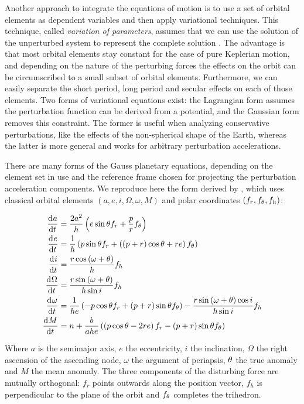 Another approach to integrate the equations of motion is to use a set of orbital elements as dependent variables and then apply variational techniques. This technique, called \textit{variation of parameters}, assumes that we can use the solution of the unperturbed system to represent the complete solution \cite{vallado2001fundamentals}. The advantage is that most orbital elements stay constant for the case of pure Keplerian motion, and depending on the nature of the perturbing forces the effects on the orbit can be circumscribed to a small subset of orbital elements. Furthermore, we can easily separate the short period, long period and secular effects on each of those elements. Two forms of variational equations exist: the Lagrangian form assumes the perturbation function can be derived from a potential, and the Gaussian form removes this constraint. The former is useful when analyzing conservative perturbations, like the effects of the non-spherical shape of the Earth, whereas the latter is more general and works for arbitrary perturbation accelerations.

There are many forms of the Gauss planetary equations, depending on the element set in use and the reference frame chosen for projecting the perturbation acceleration components. We reproduce here the form derived by \cite{battin1999introduction}, which uses classical orbital elements $(a, e, i, \Omega, \omega, M)$ and polar coordinates $(f_r, f_{\theta}, f_h)$:

\begin{align}
\deriv{a}{t} & = \frac{2 a^2}{h} \left( e \sin{\ta} f_r + \frac{p}{r} f_{\ta} \right) \\
\deriv{e}{t} & = \frac{1}{h} \left( p \sin{\ta} f_r + \left( \left( p + r \right) \cos{\ta} + r e \right) f_{\theta} \right) \\
\deriv{i}{t} & = \frac{r \cos{\arglat}}{h} f_h \\
\deriv{\Omega}{t} & = \frac{r \sin{\arglat}}{h \sin{i}} f_h \\
\deriv{\omega}{t} & = \frac{1}{he} \left( -p \cos{\ta} f_r + \left( p + r \right) \sin{\ta} f_{\theta} \right) - \frac{r \sin{\arglat} \cos{i}}{h \sin{i}} f_h \\
\deriv{M}{t} & = n + \frac{b}{ahe} \left( \left( p \cos{\ta} - 2 re \right) f_r - \left( p + r \right) \sin{\ta} f_{\ta} \right) \\
\end{align}

Where $a$ is the semimajor axis, $e$ the eccentricity, $i$ the inclination, $\Omega$ the right ascension of the ascending node, $\omega$ the argument of periapsis, $\theta$ the true anomaly and $M$ the mean anomaly. The three components of the disturbing force are mutually orthogonal: $f_r$ points outwards along the position vector, $f_h$ is perpendicular to the plane of the orbit and $f_{\theta}$ completes the trihedron.

